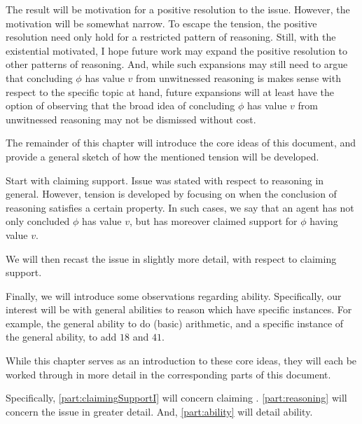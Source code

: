 \begin{note}
  The result will be motivation for a positive resolution to the issue.
  However, the motivation will be somewhat narrow.
  To escape the tension, the positive resolution need only hold for a restricted pattern of reasoning.
  Still, with the existential motivated, I hope future work may expand the positive resolution to other patterns of reasoning.
  And, while such expansions may still need to argue that concluding \(\phi\) has value \(v\) from unwitnessed reasoning is makes sense with respect to the specific topic at hand, future expansions will at least have the option of observing that the broad idea of concluding \(\phi\) has value \(v\) from unwitnessed reasoning may not be dismissed without cost.
\end{note}

\begin{note}
  The remainder of this chapter will introduce the core ideas of this document, and provide a general sketch of how the mentioned tension will be developed.
\end{note}

\begin{note}
  Start with claiming support.
  Issue was stated with respect to reasoning in general.
  However, tension is developed by focusing on when the conclusion of reasoning satisfies a certain property.
  In such cases, we say that an agent has not only concluded \(\phi\) has value \(v\), but has moreover claimed support for \(\phi\) having value \(v\).

  We will then recast the issue in slightly more detail, with respect to claiming support.

  Finally, we will introduce some observations regarding ability.
  Specifically, our interest will be with general abilities to reason which have specific instances.
  For example, the general ability to do (basic) arithmetic, and a specific instance of the general ability, to add \(18\) and \(41\).
\end{note}

\begin{note}
  While this chapter serves as an introduction to these core ideas, they will each be worked through in more detail in the corresponding parts of this document.

  Specifically, \autoref{part:claimingSupportI} will concern claiming \support{}.
  \autoref{part:reasoning} will concern the issue in greater detail.
  And, \autoref{part:ability} will detail ability.
\end{note}


